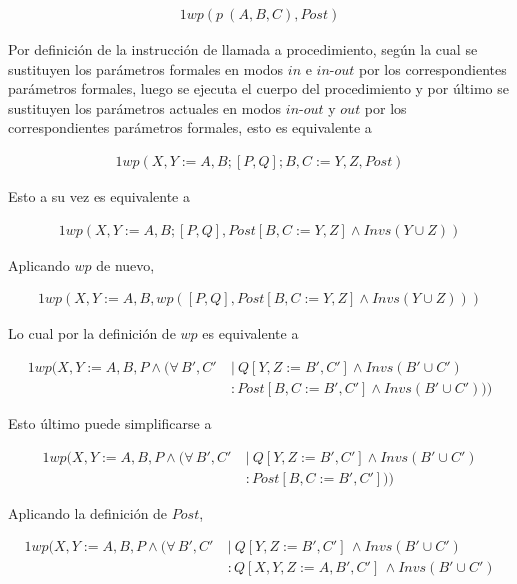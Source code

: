 \begin{alignat}{1}
wp(p\  (A,B,C), Post)
\end{alignat}

Por definición de la instrucción de llamada a procedimiento, según la cual se sustituyen los parámetros formales en modos $in$ e $in\textrm{-}out$ por los correspondientes parámetros formales, luego se ejecuta el
cuerpo del procedimiento y por último se sustituyen los parámetros
actuales en modos $in\textrm{-}out$ y $out$ por los correspondientes parámetros formales, esto es equivalente a

\begin{alignat}{1}
wp(X,Y := A,B; [P,Q]; B,C := Y,Z, Post)
\end{alignat}

Esto a su vez es equivalente a

\begin{alignat}{1}
wp(X,Y := A,B; [P,Q], Post[B,C := Y,Z] \land Invs(Y \cup Z))
\end{alignat}

Aplicando $wp$ de nuevo,

\begin{alignat}{1}
wp(X,Y := A,B, wp([P,Q], Post[B,C := Y,Z] \land Invs(Y \cup Z)))
\end{alignat}

Lo cual por la definición de $wp$ es equivalente a

\begin{alignat}{1}
wp(X,Y := A,B, P \land (\forall\, B',C'\ &|\ Q [Y,Z := B',C'] \land Invs (B' \cup C') \nonumber \\
                                       &: Post [B,C := B',C'] \land Invs (B' \cup C')))
\end{alignat}

Esto último puede simplificarse a

\begin{alignat}{1}
wp(X,Y := A,B, P \land (\forall\, B',C'\ &|\ Q [Y,Z := B',C'] \land Invs (B' \cup C') \nonumber \\
                                       &: Post [B,C := B',C']))
\end{alignat}

Aplicando la definición de $Post$,

\begin{alignat}{1}
wp(X,Y := A,B, P \land (\forall\, B',C'\ &|\ Q [Y,Z := B',C']\, \land Invs (B' \cup C')  \nonumber \\
                                       &:  Q [X,Y,Z := A, B',C']\, \land Invs (B' \cup C')
\end{alignat}

